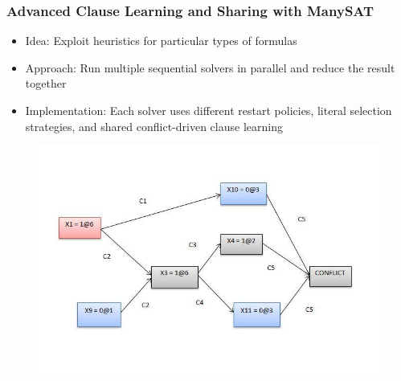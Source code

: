 \documentclass[handout,10pt]{beamer}
\begin{document}
\begin{frame}
	\frametitle{Advanced Clause Learning and Sharing with ManySAT}
	\begin{itemize}
		\item Idea: Exploit heuristics for particular types of formulas
		\item Approach: Run multiple sequential solvers in parallel and reduce the result together
		\item Implementation: Each solver uses different restart policies, literal selection strategies, and shared
		conflict-driven clause learning 
	\end{itemize}
\begin{figure}
\centering
\includegraphics[scale = 0.32]{implication.jpg}
\end{figure}
\end{frame}
\end{document}
